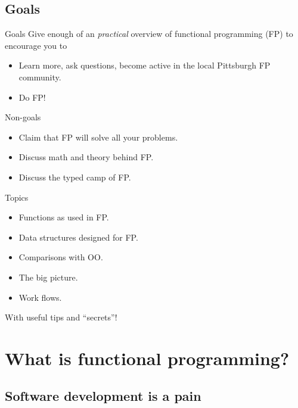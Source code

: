 \subsection{Goals}

\begin{frame}{Goals}
  Give enough of an \emph{practical} overview of functional
  programming (FP) to encourage you to
  \begin{itemize}
  \item Learn more, ask questions, become active in the local Pittsburgh FP community.
  \item Do FP!
  \end{itemize}
\end{frame}

\begin{frame}{Non-goals}
  \begin{itemize}
  \item Claim that FP will solve all your problems.
  \item Discuss math and theory behind FP.
  \item Discuss the typed camp of FP.
  \end{itemize}
\end{frame}

\begin{frame}{Topics}
  \begin{itemize}
  \item Functions as used in FP.
  \item Data structures designed for FP.
  \item Comparisons with OO.
  \item The big picture.
  \item Work flows.
  \end{itemize}

  With useful tips and ``secrets''!
\end{frame}

\section{What is functional programming?}

\subsection{Software development is a pain}

